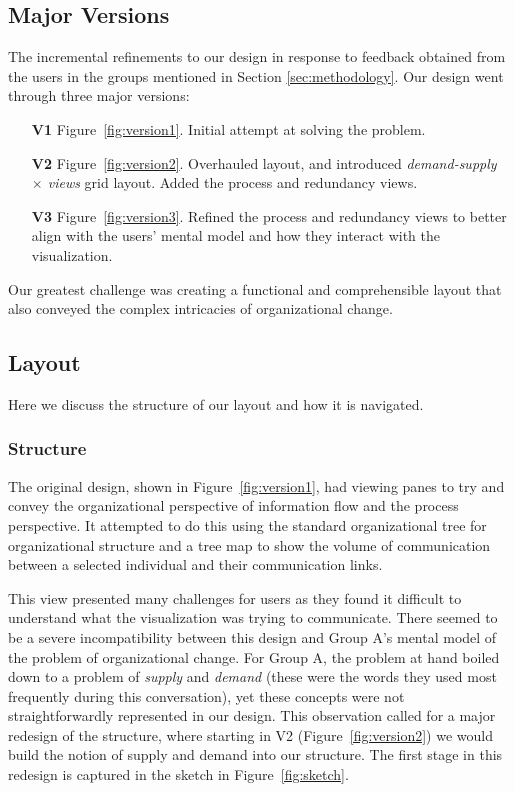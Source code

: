 \documentclass[journal]{vgtc}                %
\begin{document}
\subsection{Major Versions}

The incremental refinements to our design in response to feedback obtained from the users in the groups mentioned in Section \ref{sec:methodology}. Our design went through three major versions:

\begin{enumerate}
\item [\textbf{V1}] Figure~\ref{fig:version1}. Initial attempt at solving the problem. 
\item [\textbf{V2}] Figure~\ref{fig:version2}. Overhauled layout, and introduced \emph{demand-supply $\times$ views} grid layout. Added the process and redundancy views.
\item [\textbf{V3}] Figure~\ref{fig:version3}. Refined the process and redundancy views to better align with the users' mental model and how they interact with the visualization.
\end{enumerate}

Our greatest challenge was creating a functional and comprehensible layout that also conveyed the complex intricacies of organizational change.

\subsection{Layout}
Here we discuss the structure of our layout and how it is navigated. 
\subsubsection{Structure}
The original design, shown in Figure~\ref{fig:version1}, had  viewing panes to try and convey the organizational perspective of information flow and the process perspective.  It attempted to do this using the standard organizational tree for organizational structure and a tree map to show the volume of communication between a selected individual and their communication links.

This view presented many challenges for users as they found it difficult to understand what the visualization was trying to communicate. There seemed to be a severe incompatibility between this design and Group A's mental model of the problem of organizational change. For Group A, the problem at hand boiled down to a problem of \emph{supply} and \emph{demand} (these were the words they used most frequently during this conversation), yet these concepts were not straightforwardly represented in our design. This observation called for a major redesign of the structure, where starting in V2 (Figure~\ref{fig:version2}) we would build the notion of supply and demand into our structure. The first stage in this redesign is captured in the sketch in Figure~\ref{fig:sketch}.
\end{document}
